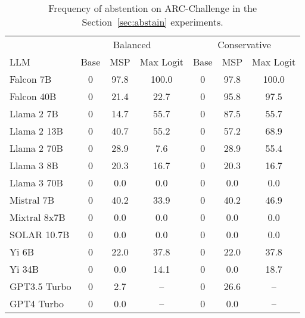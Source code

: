 \begin{table*}[h]
\centering
\caption{Frequency of abstention on ARC-Challenge in the Section~\ref{sec:abstain} experiments.}
\label{tab:arc_pct_abstained}
\begin{tabular}{lcccccc}
\toprule
& \multicolumn{3}{c}{Balanced} & \multicolumn{3}{c}{Conservative} \\ 
LLM & Base & MSP & Max Logit & Base & MSP & Max Logit \\ 
\cmidrule(lr){1-1}\cmidrule(lr){2-4}\cmidrule(lr){5-7} 
Falcon 7B & 0 & 97.8 & 100.0 & 0 & 97.8 & 100.0\\
Falcon 40B & 0 & 21.4 & 22.7 & 0 & 95.8 & 97.5\\
Llama 2 7B & 0 & 14.7 & 55.7 & 0 & 87.5 & 55.7\\
Llama 2 13B & 0 & 40.7 & 55.2 & 0 & 57.2 & 68.9\\
Llama 2 70B & 0 & 28.9 & 7.6 & 0 & 28.9 & 55.4\\
Llama 3 8B & 0 & 20.3 & 16.7 & 0 & 20.3 & 16.7\\
Llama 3 70B & 0 & 0.0 & 0.0 & 0 & 0.0 & 0.0\\
Mistral 7B & 0 & 40.2 & 33.9 & 0 & 40.2 & 46.9\\
Mixtral 8x7B & 0 & 0.0 & 0.0 & 0 & 0.0 & 0.0\\
SOLAR 10.7B & 0 & 0.0 & 0.0 & 0 & 0.0 & 0.0\\
Yi 6B & 0 & 22.0 & 37.8 & 0 & 22.0 & 37.8\\
Yi 34B & 0 & 0.0 & 14.1 & 0 & 0.0 & 18.7\\
GPT3.5 Turbo & 0 & 2.7 & -- & 0 & 26.6 & --\\
GPT4 Turbo & 0 & 0.0 & -- & 0 & 0.0 & --\\
\bottomrule
\end{tabular}
\end{table*}
